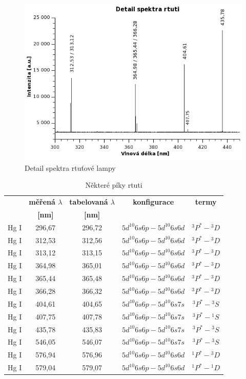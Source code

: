\documentclass[12pt]{article}
\begin{document}
\begin{figure}[h!]
  \centering
  \includegraphics[width=13cm]{img/rtut2.png}
  \caption{Detail spektra rtuťové lampy}
  \label{fig:rtut2} 
\end{figure}

\begin{table}[h!]
 \centering
 \begin{tabular}{|c|c|c|c|c|}
  \hline
  {\bf } & {\bf měřená $\lambda$} & {\bf tabelovaná $\lambda$} & {\bf konfigurace} & {\bf termy} \\
	 & {\bf[nm]} & {\bf[nm]} & & \\   
   \hline \hline
	Hg I & 296,67 & 296,72 & $5d^{10}6s6p - 5d^{10}6s6d$ & $^3P^*-{^3D}  $ \\
	Hg I & 312,53 & 312,56 & $5d^{10}6s6p - 5d^{10}6s6d$ & $^3P^*-{^3D}  $ \\
	Hg I & 313,12 & 313,15 & $5d^{10}6s6p - 5d^{10}6s6d$ & $^3P^*-{^3D}  $ \\

	Hg I & 364,98 & 365,01 & $5d^{10}6s6p - 5d^{10}6s6d$ & $^3P^*-{^3D}  $ \\
	Hg I & 365,44 & 365,48 & $5d^{10}6s6p - 5d^{10}6s6d$ & $^3P^*-{^3D} $ \\
	Hg I & 366,28 & 366,32 & $5d^{10}6s6p - 5d^{10}6s6d$ & $^3P^*-{^3D} $ \\

	Hg I & 404,61 & 404,65 & $5d^{10}6s6p - 5d^{10}6s7s$ & $^3P^*-{^3S}  $ \\
	Hg I & 407,75 & 407,78 & $5d^{10}6s6p - 5d^{10}6s7s$ & $^3P^*-{^1S}  $ \\
	Hg I & 435,78 & 435,83 & $5d^{10}6s6p - 5d^{10}6s7s$ & $^3P^*-{^3S}  $ \\

	Hg I & 546,05 & 546,07 & $5d^{10}6s6p - 5d^{10}6s7s$ & $^3P^*-{^3S}  $ \\

	Hg I & 576,94 & 576,96 & $5d^{10}6s6p - 5d^{10}6s6d$ & $^1P^*-{^3D} $ \\
	Hg I & 579,04 & 579,07 & $5d^{10}6s6p - 5d^{10}6s6d$ & $^1P^*-{^1D} $ \\
  \hline
  \end{tabular}
  \caption{Některé píky rtuti}
  \label{fig:Hg}
\end{table}
\end{document}
